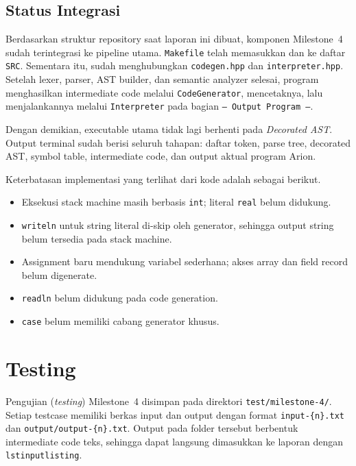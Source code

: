\documentclass[11pt,a4paper]{article}
\begin{document}
\subsection{Status Integrasi}

Berdasarkan struktur repository saat laporan ini dibuat, komponen Milestone~4
sudah terintegrasi ke pipeline utama. \texttt{Makefile} telah memasukkan
 dan  ke daftar
\texttt{SRC}. Sementara itu,  sudah menghubungkan
\texttt{codegen.hpp} dan \texttt{interpreter.hpp}. Setelah lexer, parser, AST
builder, dan semantic analyzer selesai, program menghasilkan intermediate code
melalui \texttt{CodeGenerator}, mencetaknya, lalu menjalankannya melalui
\texttt{Interpreter} pada bagian \texttt{--- Output Program ---}.

Dengan demikian, executable utama tidak lagi berhenti pada \textit{Decorated
AST}. Output terminal sudah berisi seluruh tahapan: daftar token, parse tree,
decorated AST, symbol table, intermediate code, dan output aktual program Arion.

Keterbatasan implementasi yang terlihat dari kode adalah sebagai berikut.

\begin{itemize}
    \item Eksekusi stack machine masih berbasis \texttt{int}; literal
          \texttt{real} belum didukung.
    \item \texttt{writeln} untuk string literal di-skip oleh generator, sehingga
          output string belum tersedia pada stack machine.
    \item Assignment baru mendukung variabel sederhana; akses array dan field
          record belum digenerate.
    \item \texttt{readln} belum didukung pada code generation.
    \item \texttt{case} belum memiliki cabang generator khusus.
\end{itemize}

\section{Testing}

Pengujian (\textit{testing}) Milestone~4 disimpan pada direktori
\texttt{test/milestone-4/}. Setiap testcase memiliki berkas input dan output
dengan format \texttt{input-\{n\}.txt} dan
\texttt{output/output-\{n\}.txt}. Output pada folder tersebut berbentuk
intermediate code teks, sehingga dapat langsung dimasukkan ke laporan dengan
\texttt{lstinputlisting}.
\end{document}
